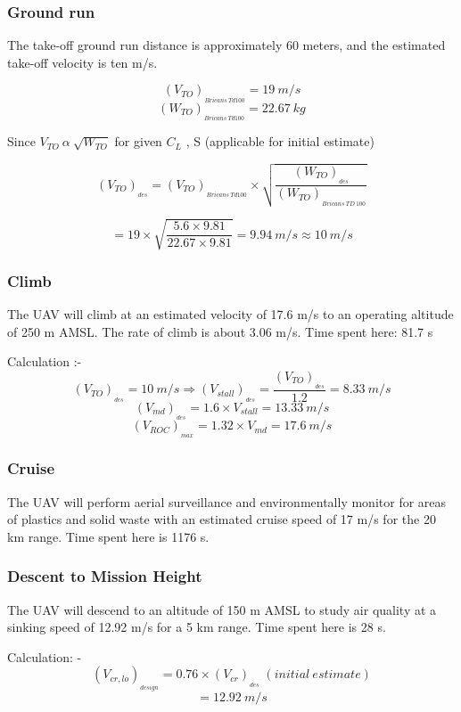 \documentclass[12 pt]{article}
\begin{document}
\subsubsection{Ground run}
The take-off ground run distance is approximately 60 meters, and the estimated take-off velocity is ten m/s. \cite{EgglestonUnknownTitle2015}

$$ (V_{TO})_{_{Bricans \: Td100}} = 19 \: m/s$$
$$ (W_{TO})_{_{Bricans \: Td100}} = 22.67 \: kg$$

Since $ V_{TO} \: \alpha \: \sqrt{W_{TO}} $ for given $C_L$ , S (applicable for initial estimate)

$$ (V_{TO})_{_{des}} = (V_{TO})_{_{Bricans \: Td100}} \times \sqrt{\frac{(W_{TO})_{_{des}}}{(W_{TO})_{_{Bricans \: TD \: 100}}}} $$

$$ = 19 \times \sqrt{\frac{5.6 \times 9.81}{22.67 \times 9.81}} = 9.94 \: m/s \approx 10 \: m/s $$

\subsubsection{Climb \cite{1000_questions} }
The UAV will climb at an estimated velocity of 17.6 m/s to an operating altitude of 250 m AMSL. The rate of climb is about 3.06 m/s. Time spent here: 81.7 s

Calculation :- 
$$ (V_{TO})_{_{des}} = 10 \: m/s \Rightarrow (V_{stall})_{_{des}} = \frac{(V_{TO})_{_{des}}}{1.2} = 8.33 \: m/s $$
$$ (V_{md})_{_{des}} = 1.6 \times V_{stall} = 13.33 \: m/s $$
$$ (V_{ROC})_{_{max}} = 1.32 \times V_{md} = 17.6 \: m/s $$

\subsubsection{Cruise \cite{alhajjaji2017design}}
The UAV will perform aerial surveillance and environmentally monitor for areas of plastics and solid waste with an estimated cruise speed of 17 m/s for the 20 km range. Time spent here is 1176 s.

\subsubsection{Descent to Mission Height}
The UAV will descend to an altitude of 150 m AMSL to study air quality at a sinking speed of 12.92 m/s for a 5 km range. Time spent here is 28 s.

Calculation: - 
$$ (V_{cr,lo})_{_{design}} = 0.76 \times (V_{cr})_{_{des}} \;  (initial \: estimate) $$
$$ = 12.92 \: m/s $$
\end{document}
